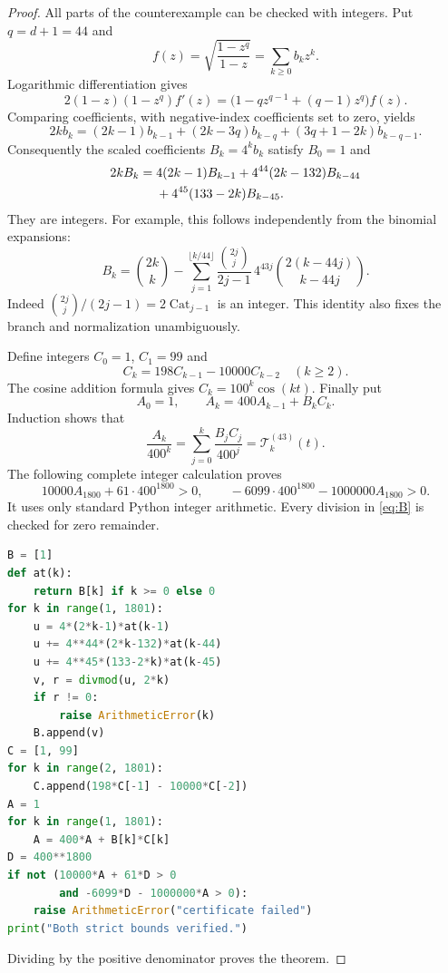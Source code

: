 \documentclass[11pt]{article}
\begin{document}
\begin{proof}
All parts of the counterexample can be checked with integers.
Put $q=d+1=44$ and
\[
 f(z)=\sqrt{\frac{1-z^q}{1-z}}=\sum_{k\geq0}b_kz^k.
\]
Logarithmic differentiation gives
\[
 2(1-z)(1-z^q)f'(z)
   =\bigl(1-qz^{q-1}+(q-1)z^q\bigr)f(z).
\]
Comparing coefficients, with negative-index coefficients set to zero,
yields
\[
 2k b_k=(2k-1)b_{k-1}
       +(2k-3q)b_{k-q}+(3q+1-2k)b_{k-q-1}.
\]
Consequently the scaled coefficients $B_k=4^k b_k$ satisfy $B_0=1$ and
\begin{align}
 2kB_k={}&4(2k-1)B_{k-1}
   +4^{44}(2k-132)B_{k-44}\notag\\
   &+4^{45}(133-2k)B_{k-45}.
 \label{eq:B}
\end{align}
They are integers. For example, this follows independently from the
binomial expansions:
\begin{equation}
 B_k=\binom{2k}{k}
 -\sum_{j=1}^{\lfloor k/44\rfloor}
 \frac{\binom{2j}{j}}{2j-1}\,
 4^{43j}\binom{2(k-44j)}{k-44j}.
 \label{eq:independent}
\end{equation}
Indeed $\binom{2j}{j}/(2j-1)=2\operatorname{Cat}_{j-1}$ is an integer.
This identity also fixes the branch and normalization unambiguously.

Define integers $C_0=1$, $C_1=99$ and
\[
 C_k=198C_{k-1}-10000C_{k-2}\quad(k\geq2).
\]
The cosine addition formula gives $C_k=100^k\cos(kt)$.
Finally put
\[
 A_0=1,\qquad A_k=400A_{k-1}+B_kC_k.
\]
Induction shows that
\[
 \frac{A_k}{400^k}
   =\sum_{j=0}^k\frac{B_jC_j}{400^j}
   =\mathcal T_k^{(43)}(t).
\]
The following complete integer calculation proves
\[
 10000A_{1800}+61\cdot400^{1800}>0,\qquad
 -6099\cdot400^{1800}-1000000A_{1800}>0.
\]
It uses only standard Python integer arithmetic. Every division in
\eqref{eq:B} is checked for zero remainder.

\begin{lstlisting}[language=Python]
B = [1]
def at(k):
    return B[k] if k >= 0 else 0
for k in range(1, 1801):
    u = 4*(2*k-1)*at(k-1)
    u += 4**44*(2*k-132)*at(k-44)
    u += 4**45*(133-2*k)*at(k-45)
    v, r = divmod(u, 2*k)
    if r != 0:
        raise ArithmeticError(k)
    B.append(v)
C = [1, 99]
for k in range(2, 1801):
    C.append(198*C[-1] - 10000*C[-2])
A = 1
for k in range(1, 1801):
    A = 400*A + B[k]*C[k]
D = 400**1800
if not (10000*A + 61*D > 0
        and -6099*D - 1000000*A > 0):
    raise ArithmeticError("certificate failed")
print("Both strict bounds verified.")
\end{lstlisting}
Dividing by the positive denominator proves the theorem.
\end{proof}
\end{document}

